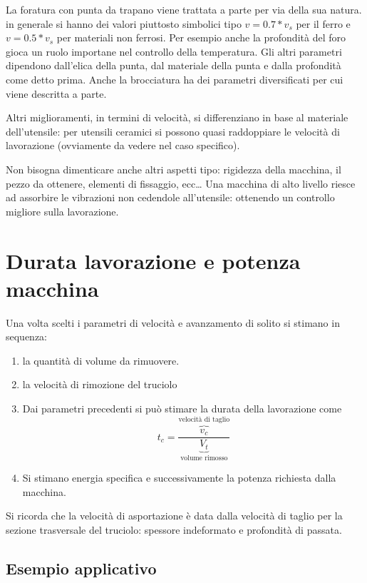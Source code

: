 La foratura con punta da trapano viene trattata a parte per via della sua natura. in generale si hanno dei valori piuttosto simbolici tipo $v = 0.7*v_s$ per il ferro e $v = 0.5*v_s$ per materiali non ferrosi.
Per esempio anche la profondità del foro gioca un ruolo importane nel controllo della temperatura.
Gli altri parametri dipendono dall'elica della punta, dal materiale della punta e dalla profondità come detto prima.
Anche la brocciatura ha dei parametri diversificati per cui viene descritta a parte.

Altri miglioramenti, in termini di velocità, si differenziano in base al materiale dell'utensile: per utensili ceramici si possono quasi raddoppiare le velocità di lavorazione (ovviamente da vedere nel caso specifico).

Non bisogna dimenticare anche altri aspetti tipo: rigidezza della macchina, il pezzo da ottenere, elementi di fissaggio, ecc\dots
Una macchina di alto livello riesce ad assorbire le vibrazioni non cedendole all'utensile: ottenendo un controllo migliore sulla lavorazione.

\section{Durata lavorazione e potenza macchina}
Una volta scelti i parametri di velocità e avanzamento di solito si stimano in sequenza:
\begin{enumerate}
\item la quantità di volume da rimuovere.
\item la velocità di rimozione del truciolo
\item Dai parametri precedenti si può stimare la durata della lavorazione come 
\begin{equation}
t_c = \frac{\overbrace{v_c}^{\text{velocità di taglio}}}{\underbrace{V_t}_{\text{volume rimosso}}}
\end{equation}
\item Si stimano energia specifica e successivamente la potenza richiesta dalla macchina.
\end{enumerate}

Si ricorda che la velocità di asportazione è data dalla velocità di taglio per la sezione trasversale del truciolo: spessore indeformato e profondità di passata.

\subsection{Esempio applicativo}

